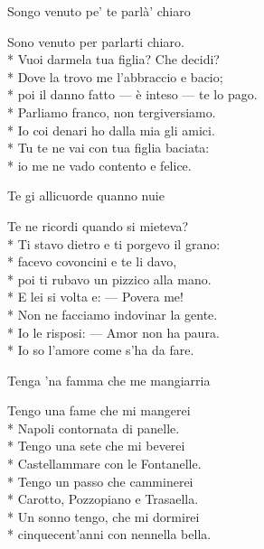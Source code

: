 \documentclass[11pt]{book}
\begin{document}
\begin{poem}{Songo venuto pe’ te parlà’ chiaro}{}
\settowidth{\versewidth}{Poi il danno fatto — è inteso — te lo pago}
\begin{altverse}
Sono venuto per parlarti chiaro.\\*
Vuoi darmela tua figlia? Che decidi?\\*
Dove la trovo me l’abbraccio e bacio;\\*
poi il danno fatto — è inteso — te lo pago.\\*
Parliamo franco, non tergiversiamo.\\*
Io coi denari ho dalla mia gli amici.\\*
Tu te ne vai con tua figlia baciata:\\*
io me ne vado contento e felice.
\end{altverse}
\end{poem}

\begin{poem}{Te gi allicuorde quanno nuie}{}
\settowidth{\versewidth}{Ti stavo dietro e ti porgevo il grano}
\begin{altverse}
Te ne ricordi quando si mieteva?\\*
Ti stavo dietro e ti porgevo il grano:\\*
facevo covoncini e te li davo,\\*
poi ti rubavo un pizzico alla mano.\\*
E lei si volta e: — Povera me!\\*
Non ne facciamo indovinar la gente.\\*
Io le risposi: — Amor non ha paura.\\*
Io so l’amore come s’ha da fare.
\end{altverse}
\end{poem}

\begin{poem}{Tenga ’na famma che me mangiarria}{}
\settowidth{\versewidth}{Cinquecent’anni con nennella bella}
\begin{altverse}
Tengo una fame che mi mangerei\\*
Napoli contornata di panelle.\\*
Tengo una sete che mi beverei\\*
Castellammare con le Fontanelle.\\*
Tengo un passo che camminerei\\*
Carotto, Pozzopiano e Trasaella.\\*
Un sonno tengo, che mi dormirei\\*
cinquecent’anni con nennella bella.
\end{altverse}
\end{poem}
\end{document}

